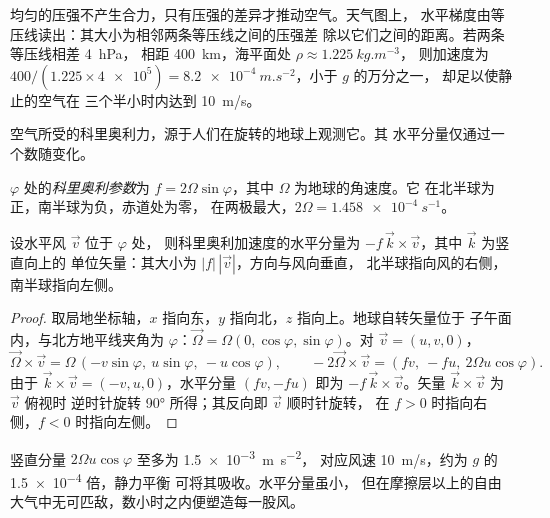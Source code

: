 均匀的压强不产生合力，只有压强的差异才推动空气。天气图上，
水平梯度由等压线读出：其大小为相邻两条等压线之间的压强差
除以它们之间的距离。若两条等压线相差 \qty{4}{hPa}，
相距 \qty{400}{km}，海平面处 $\rho \approx \qty{1.225}{kg.m^{-3}}$，
则加速度为 $400/(1.225 \times \num{4e5}) = \qty{8.2e-4}{m.s^{-2}}$，小于 $g$ 的万分之一，
却足以使静止的空气在
三个半小时内达到 \qty{10}{m/s}。

空气所受的科里奥利力，源于人们在旋转的地球上观测它。其
水平分量仅通过一个数随变化。

\begin{definition}[科里奥利参数]\label{def:b1:atmospheric-circulation:coriolis-parameter}
 $\varphi$ 处的\emph{科里奥利参数}为
$f = 2\Omega\sin\varphi$，其中 $\Omega$ 为地球的角速度。它
在北半球为正，南半球为负，赤道处为零，
在两极最大，$2\Omega = \qty{1.458e-4}{s^{-1}}$。
\end{definition}

\begin{proposition}[水平科里奥利加速度]\label{prop:b1:atmospheric-circulation:coriolis}
设水平风 $\vec v$ 位于 $\varphi$ 处，
则科里奥利加速度的水平分量为 $-f\,\vec k\times\vec v$，其中 $\vec k$ 为竖直向上的
单位矢量：其大小为 $|f|\,|\vec v|$，方向与风向垂直，
北半球指向风的右侧，南半球指向左侧。
\end{proposition}

\begin{proof}
取局地坐标轴，$x$ 指向东，$y$ 指向北，$z$ 指向上。地球自转矢量位于
子午面内，与北方地平线夹角为 $\varphi$：$\vec\Omega =
\Omega(0, \cos\varphi, \sin\varphi)$。对 $\vec v = (u, v, 0)$，
\[
  \vec\Omega\times\vec v = \Omega\,(-v\sin\varphi,\ u\sin\varphi,\ -u\cos\varphi),
  \qquad -2\vec\Omega\times\vec v = (f v,\ -f u,\ 2\Omega u\cos\varphi).
\]
由于 $\vec k\times\vec v = (-v, u, 0)$，水平分量 $(fv, -fu)$ 即为
$-f\,\vec k\times\vec v$。矢量 $\vec k\times\vec v$ 为 $\vec v$ 俯视时
逆时针旋转 \ang{90} 所得；其反向即 $\vec v$ 顺时针旋转，
在 $f > 0$ 时指向右侧，$f < 0$ 时指向左侧。
\end{proof}

竖直分量 $2\Omega u\cos\varphi$ 至多为 \qty{1.5e-3}{m.s^{-2}}，
对应风速 \qty{10}{m/s}，约为 $g$ 的 \num{1.5e-4} 倍，静力平衡
可将其吸收。水平分量虽小，
但在摩擦层以上的自由大气中无可匹敌，数小时之内便塑造每一股风。

